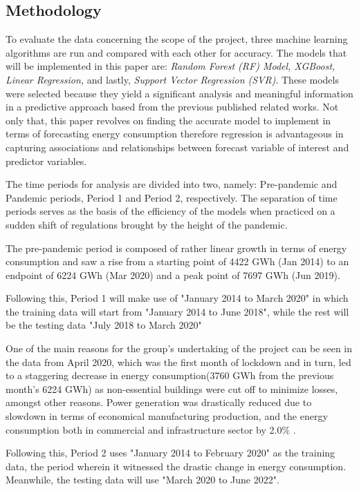 \documentclass[runningheads]{llncs}
\begin{document}
\subsection{Methodology}

To evaluate the data concerning the scope of the project, three machine learning algorithms are run and compared with each other for accuracy. The models that will be implemented in this paper are: \textit{Random Forest (RF) Model, XGBoost, Linear Regression,} and lastly, \textit{Support Vector Regression (SVR)}. These models were selected because they yield a significant analysis and meaningful information in a predictive approach based from the previous published related works. Not only that, this paper revolves on finding the accurate model to implement in terms of forecasting energy consumption therefore regression is advantageous in capturing associations and relationships between forecast variable of interest and predictor variables.

The time periods for analysis are divided into two, namely: Pre-pandemic and Pandemic periods, Period 1 and Period 2, respectively. The separation of time periods serves as the basis of the efficiency of the models when practiced on a sudden shift of regulations brought by the height of the pandemic.

The pre-pandemic period is composed of rather linear growth in terms of energy consumption and saw a rise from a starting point of 4422 GWh (Jan 2014) to an endpoint of 6224 GWh (Mar 2020) and a peak point of 7697 GWh (Jun 2019).

Following this, Period 1 will make use of "January 2014 to March 2020" in which the training data will start from "January 2014 to June 2018", while the rest will be the testing data "July 2018 to March 2020"

One of the main reasons for the group’s undertaking of the project can be seen in the data from April 2020, which was the first month of lockdown and in turn, led to a staggering decrease in energy consumption(3760 GWh from the previous month’s 6224 GWh) as non-essential buildings were cut off to minimize losses, amongst other reasons. Power generation was drastically reduced due to slowdown in terms of economical manufacturing production, and the energy consumption both in commercial and infrastructure sector by 2.0\% \cite{shin-woo}.

Following this, Period 2 uses "January 2014 to February 2020" as the training data, the period wherein it witnessed the drastic change in energy consumption. Meanwhile, the testing data will use "March 2020 to June 2022".
\end{document}
